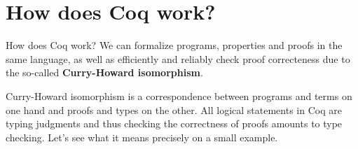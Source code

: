 \documentclass[10pt]{beamer}
\begin{document}
   \section{How does Coq work?}
\begin{frame}{How does Coq work?}
    We can formalize programs, properties and proofs in the same language, as well as efficiently and reliably check proof correcteness due to the so-called {\bf Curry-Howard isomorphism}.

    Curry-Howard isomorphism is a correspondence between programs and terms on one hand and proofs and types on the other. All logical statements in Coq are typing judgments and thus checking the correctness of proofs amounts to type checking. Let's see what it means precisely on a small example.
   \end{frame}
   
\end{document}
